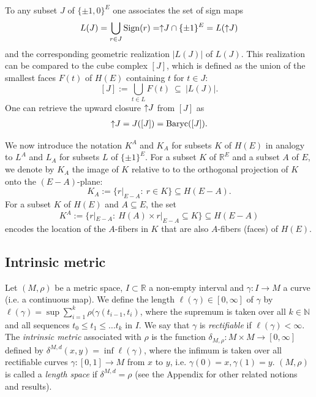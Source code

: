 \documentclass[11pt,a4paper]{amsart}
\theoremstyle{definition}
\numberwithin{equation}{section}
\DeclareMathOperator{\Baryc}{Baryc}
\DeclareMathOperator{\Sign}{Sign}
\newcommand{\covectors}{\ensuremath{L}}
\newcommand{\HH}{\ensuremath{H}}
\newcommand{\hcovectors}{J}
\begin{document}
To any subset $\hcovectors$ of $\{ \pm 1,0\}^E$  one associates the set of sign maps
\begin{align*}
L(\hcovectors)=\bigcup_{r\in \hcovectors}\Sign(r)=\uparrow\hspace*{-0.1cm}{\hcovectors}\cap \{ \pm 1\}^E=L(\uparrow\hspace*{-0.1cm}\hcovectors)
\end{align*}
and the corresponding geometric realization $|L(\hcovectors)|$ of $L(\hcovectors)$. This realization can be compared to the cube complex $[\hcovectors]$, which is defined as the union of the smallest faces $F(t)$
of $\HH(E)$ containing $t$ for $t\in \hcovectors$:
$$[\hcovectors]:=\bigcup_{t\in \covectors} F(t)~\subseteq ~|L(\hcovectors)|.$$
One can retrieve the upward closure $\uparrow\hspace*{-0.1cm}{\hcovectors}$ from $[\hcovectors]$ as
\begin{align*}
\uparrow\hspace*{-0.1cm}{\hcovectors}=\hcovectors([\hcovectors])=\Baryc([\hcovectors]).
\end{align*}

We now introduce the notation $K^A$ and $K_A$ for  subsets $K$  of $\HH(E)$  in analogy to $\covectors^A$ and $\covectors_A$ for subsets $\covectors$ of $\{ \pm 1\}^E.$ For a subset $K$ of ${\mathbb R}^E$ and a subset $A$ of $E$, we denote by $K_A$ the image of $K$ relative to  to the orthogonal projection of $K$ onto the $(E-A)$-plane:
$$K_A:=\{ r|_{E-A}: ~r\in K\}\subseteq H(E-A).$$
For a subset $K$ of $\HH(E)$ and $A\subseteq E$, the set
$$K^A:=\{ r|_{E-A}: ~\HH(A)\times r|_{E-A}\subseteq K\}\subseteq \HH(E-A)$$
encodes the location of the $A$-fibers in $K$ that are also $A$-fibers (faces) of $\HH(E).$



\subsection{Intrinsic metric}
Let $(M,\rho)$ be a metric space, $I\subset {\mathbb R}$ a non-empty interval
and $\gamma: I\rightarrow M$ a curve (i.e. a continuous map). We define the length $\ell(\gamma)\in [0,\infty]$
of $\gamma$ by $\ell(\gamma)=\sup\sum_{i=1}^k \rho(\gamma(t_{i-1},t_i)$, where the supremum is taken over all $k\in {\mathbb N}$ and all sequences $t_0\le t_1\le \ldots t_k$ in $I$.  We say that $\gamma$ is \emph{rectifiable} if
$\ell(\gamma)<\infty$. The \emph{intrinsic  metric} associated with $\rho$ is the function $\delta_{M,\rho}: M\times M \rightarrow [0,\infty]$ defined by $\delta^{M,d}(x,y)=\inf \ell(\gamma)$, where the infimum is taken over all rectifiable curves $\gamma:[0, 1]\rightarrow M$  from $x$ to $y$,
i.e. $\gamma(0) = x, \gamma(1) = y$. $(M, \rho)$ is called a \emph{length space} if $\delta^{M,d}=\rho$ (see the Appendix for other related notions and results).
\end{document}
